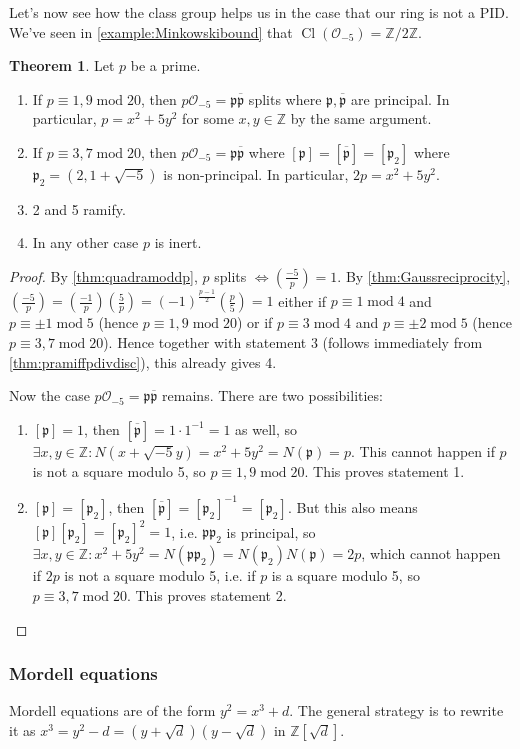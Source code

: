 \documentclass{article}
\newcommand{\Z}{\mathbb{Z}}
\newcommand{\Mod}{\operatorname{mod}}
\newcommand{\Cl}{\operatorname{Cl}}
\newcommand{\ri}{\mathcal{O}}
\newcommand{\ip}{\mathfrak{p}}
\theoremstyle{definition}
\newtheorem{thm}[defn]{Theorem}
\begin{document}
Let's now see how the class group helps us in the case that our ring is not a PID. We've seen in \ref{example:Minkowskibound} that $\Cl(\ri_{-5})=\Z/2\Z$.

\begin{thm}
Let $p$ be a prime.
\begin{enumerate}
\item If $p\equiv 1,9\Mod 20$, then $p\ri_{-5}=\ip\overline{\ip}$ splits where $\ip,\overline{\ip}$ are principal. In particular, $p=x^2+5y^2$ for some $x,y\in\Z$ by the same argument.
\item If $p\equiv 3,7\Mod 20$, then $p\ri_{-5}=\ip\overline{\ip}$ where $[\ip]=[\overline{\ip}]=[\ip_2]$ where $\ip_2=\left(2,1+\sqrt{-5}\right)$ is non-principal. In particular, $2p=x^2+5y^2$.
\item 2 and 5 ramify.
\item In any other case $p$ is inert.
\end{enumerate}
\end{thm}
\begin{proof}
By \ref{thm:quadramoddp}, $p$ splits $\iff\left(\frac{-5}{p}\right)=1$. By \ref{thm:Gaussreciprocity}, $\left(\frac{-5}{p}\right)=\left(\frac{-1}{p}\right)\left(\frac{5}{p}\right)=(-1)^{\frac{p-1}{2}}\left(\frac{p}{5}\right)=1$ either if $p\equiv 1\Mod 4$ and $p\equiv \pm 1\Mod 5$ (hence $p\equiv 1,9\Mod 20$) or if $p\equiv 3\Mod 4$ and $p\equiv \pm 2\Mod 5$ (hence $p\equiv 3,7\Mod 20$). Hence together with statement 3 (follows immediately from \ref{thm:pramiffpdivdisc}), this already gives 4.

Now the case $p\ri_{-5}=\ip\overline{\ip}$ remains. There are two possibilities:
\begin{enumerate}
\item $[\ip]=1$, then $[\overline{\ip}]=1\cdot 1^{-1}=1$ as well, so $\exists x,y\in\Z:N\left(x+\sqrt{-5}y\right)=x^2+5y^2=N(\ip)=p$. This cannot happen if $p$ is not a square modulo 5, so $p\equiv 1,9\Mod 20$. This proves statement 1.
\item $[\ip]=[\ip_2]$, then $[\overline{\ip}]=[\ip_2]^{-1}=[\ip_2]$. But this also means $[\ip][\ip_2]=[\ip_2]^2=1$, i.e. $\ip\ip_2$ is principal, so $\exists x,y\in\Z:x^2+5y^2=N(\ip\ip_2)=N(\ip_2)N(\ip)=2p$, which cannot happen if $2p$ is not a square modulo 5, i.e. if $p$ is a square modulo 5, so $p\equiv 3,7\Mod 20$. This proves statement 2.
\end{enumerate}
\end{proof}

\subsubsection{Mordell equations}
Mordell equations are of the form $y^2=x^3+d$. The general strategy is to rewrite it as $x^3=y^2-d=\left(y+\sqrt{d}\right)\left(y-\sqrt{d}\right)$ in $\Z\left[\sqrt{d}\right]$.
\end{document}
